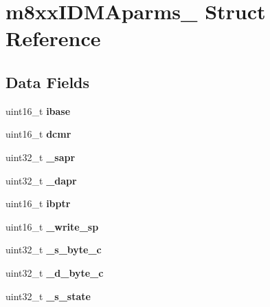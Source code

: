 \hypertarget{structm8xxIDMAparms__}{}\section{m8xx\+I\+D\+M\+Aparms\+\_\+ Struct Reference}
\label{structm8xxIDMAparms__}
\subsection*{Data Fields}
\begin{DoxyCompactItemize}
\item 
\mbox{\label{structm8xxIDMAparms___aee409268e35b1521efec871d580ced17}} 
uint16\+\_\+t {\bfseries ibase}
\item 
\mbox{\label{structm8xxIDMAparms___a395f6d2ae8dc2d98ec547421c33e0a50}} 
uint16\+\_\+t {\bfseries dcmr}
\item 
\mbox{\label{structm8xxIDMAparms___ac07fb3408a397d4539817b56492fcf4c}} 
uint32\+\_\+t {\bfseries \+\_\+sapr}
\item 
\mbox{\label{structm8xxIDMAparms___a9ee32cc1a89b2657cf4e38de8aad5a6d}} 
uint32\+\_\+t {\bfseries \+\_\+dapr}
\item 
\mbox{\label{structm8xxIDMAparms___a6161db6449eb9f33f4467f568dc52e72}} 
uint16\+\_\+t {\bfseries ibptr}
\item 
\mbox{\label{structm8xxIDMAparms___a23ea328031d834c35f6672c62c8b7ef7}} 
uint16\+\_\+t {\bfseries \+\_\+write\+\_\+sp}
\item 
\mbox{\label{structm8xxIDMAparms___a13ec3478d733cc71f773d7e0c6c86a17}} 
uint32\+\_\+t {\bfseries \+\_\+s\+\_\+byte\+\_\+c}
\item 
\mbox{\label{structm8xxIDMAparms___a4b82eeabaa2561fc7ba415c7d13d463d}} 
uint32\+\_\+t {\bfseries \+\_\+d\+\_\+byte\+\_\+c}
\item 
\mbox{\label{structm8xxIDMAparms___a7befacdd7a28b4488ac368c46f1ca0fb}} 
uint32\+\_\+t {\bfseries \+\_\+s\+\_\+state}

\end{DoxyCompactItemize}
